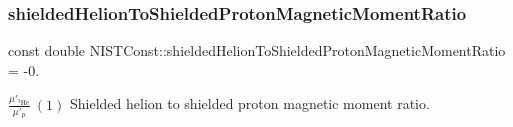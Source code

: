 \subsubsection{\texorpdfstring{shielded\+Helion\+To\+Shielded\+Proton\+Magnetic\+Moment\+Ratio}{shieldedHelionToShieldedProtonMagneticMomentRatio}}
{\footnotesize\ttfamily const double N\+I\+S\+T\+Const\+::shielded\+Helion\+To\+Shielded\+Proton\+Magnetic\+Moment\+Ratio = -\/0.}

$\frac{\mu'_{^3\textrm{He}}}{\mu'_p} \ (1)$ Shielded helion to shielded proton magnetic moment ratio. 
